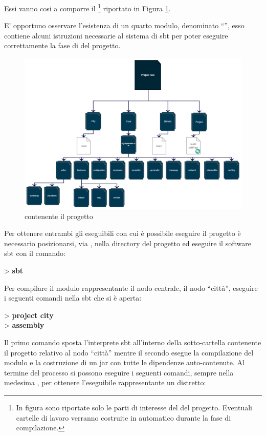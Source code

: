 Essi vanno cosi a comporre il \footnote{In figura sono riportate solo le parti di interesse del  del progetto. Eventuali cartelle di lavoro verranno costruite in automatico durante la fase di compilazione.} riportato in Figura \ref{setup-compile-structure}.

E' opportuno osservare l'esistenza di un quarto modulo, denominato ``'', esso contiene alcuni istruzioni necessarie al sistema di  \ac{sbt} per poter eseguire correttamente la fase di  del progetto.

\begin{figure}[h]
\centering
\includegraphics[scale=0.4]{images/configuration/project-design.png}
\caption{ contenente il progetto}
\label{setup-compile-structure}
\end{figure}

Per ottenere entrambi gli eseguibili con cui è possibile eseguire il progetto è necessario posizionarsi, via , nella directory  del progetto ed eseguire il software \ac{sbt} con il comando:

> \textbf{sbt}

Per compilare il modulo rappresentante il nodo centrale, il nodo ``città'', eseguire i seguenti comandi nella  \ac{sbt} che si è aperta:

> \textbf{project city}\\
> \textbf{assembly}

Il primo comando sposta l'interprete \ac{sbt} all'interno della sotto-cartella contenente il progetto relativo al nodo ``città'' mentre il secondo esegue la compilazione del modulo e la costruzione di un \acs{jar} con tutte le dipendenze auto-contenute. Al termine del processo si possono eseguire i seguenti comandi, sempre nella medesima , per ottenere l'eseguibile rappresentante un distretto:

